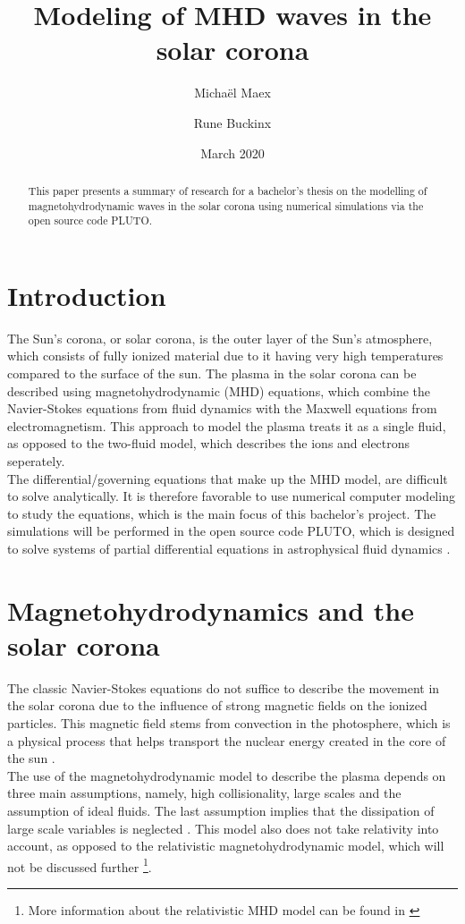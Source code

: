 \documentclass{article}
\title{Modeling of MHD waves in the solar corona}
\author{Micha\"el Maex \and Rune Buckinx}
\date{March 2020}
\begin{document}
\maketitle

\begin{abstract}
    This paper presents a summary of research for a bachelor's thesis on the modelling of magnetohydrodynamic waves in the solar corona using numerical simulations via the open source code PLUTO. 
\end{abstract}
\tableofcontents
\newpage
\section{Introduction} \label{sec:introduction}
The Sun's corona, or solar corona, is the outer layer of the Sun's atmosphere, which consists of fully ionized material due to it having very high temperatures compared to the surface of the sun. The plasma in the solar corona can be described using magnetohydrodynamic (MHD) equations, which combine the Navier-Stokes equations from fluid dynamics with the Maxwell equations from electromagnetism. This approach to model the plasma treats it as a single fluid, as opposed to the two-fluid model, which describes the ions and electrons seperately. \\

The differential/governing equations that make up the MHD model, are difficult to solve analytically. It is therefore favorable to use numerical computer modeling to study the equations, which is the main focus of this bachelor's project. The simulations will be performed in the open source code PLUTO, which is designed to solve systems of partial differential equations in astrophysical fluid dynamics \cite{mignone2011pluto}. 
\section{Magnetohydrodynamics and the solar corona} \label{sec:magnetohydrodynamics_and_the_solar_corona}
The classic Navier-Stokes equations do not suffice to describe the movement in the solar corona due to the influence of strong magnetic fields on the ionized particles. This magnetic field stems from convection in the photosphere, which is a physical process that helps transport the nuclear energy created in the core of the sun \cite{brun2017magnetism}.\\

The use of the magnetohydrodynamic model to describe the plasma depends on three main assumptions, namely, high collisionality, large scales and the assumption of ideal fluids. The last assumption implies that the dissipation of large scale variables is neglected \cite{goedbloed2004principles}. This model also does not take relativity into account, as opposed to the relativistic magnetohydrodynamic model, which will not be discussed further \footnote{More information about the relativistic MHD model can be found in \cite{karas2005introduction}}.
\end{document}
